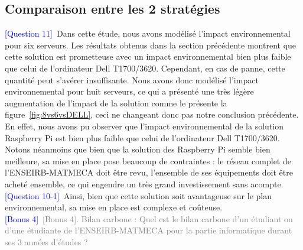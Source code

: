 \documentclass[12pt,a4paper]{paper}
\begin{document}
\subsection{Comparaison entre les 2 stratégies}
\textcolor{blue}{[Question 11]}~Dans cette étude, nous avons modélisé l'impact environnemental pour six serveurs. Les résultats obtenus dans la section précédente montrent que cette solution est prometteuse avec un impact environnemental bien plus faible que celui de l'ordinateur Dell T1700/3620. Cependant, en cas de panne, cette quantité peut s'avérer insuffisante. Nous avons donc modélisé l'impact environnemental pour huit serveurs, ce qui a présenté une très légère augmentation de l'impact de la solution comme le présente la figure~\ref{fig:8vs6vsDELL}, ceci ne changeant donc pas notre conclusion précédente. En effet, nous avons pu observer que l'impact environnemental de la solution Raspberry Pi est bien plus faible que celui de l'ordinateur Dell T1700/3620.\\
Notons néanmoins que bien que la solution des Raspberry Pi semble bien meilleure, sa mise en place pose beaucoup de contraintes : le réseau complet de l'ENSEIRB-MATMECA doit être revu, l'ensemble de ses équipements doit être acheté ensemble, ce qui engendre un très grand investissement sans acompte. \\
\textcolor{blue}{[Question 10-1]}~Ainsi, bien que cette solution soit avantageuse sur le plan environnemental, sa mise en place est complexe et coûteuse.\\
\textcolor{blue}{[Bonus 4]}~\textcolor{gray}{[Bonus 4]. Bilan carbone : Quel est le bilan carbone d’un étudiant ou d’une étudiante de}
\textcolor{gray}{l’ENSEIRB-MATMECA pour la partie informatique durant ses 3 années d’études ?}
\end{document}
